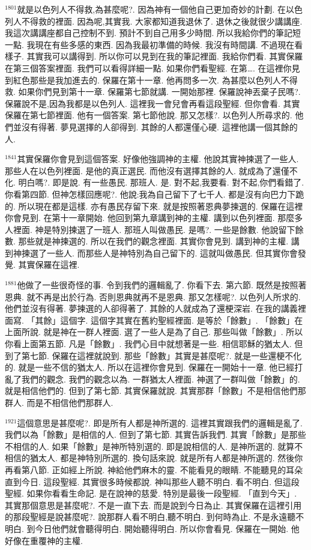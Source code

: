 \documentclass{book}
\begin{document}
$^{1801}$就是以色列人不得救,為甚麼呢?.
因為神有一個他自己更加奇妙的計劃.
在以色列人不得救的裡面.
因為呢,其實我.
大家都知道我退休了.
退休之後就很少講講座.
我這次講講座都自己控制不到.
預計不到自己用多少時間.
所以我給你們的筆記短一點.
我現在有些多感的東西.
因為我最初準備的時候.
我沒有時間講.
不過現在看樣子.
其實我可以講得到.
所以你可以見到在我的筆記裡面.
我給你們看.
其實保羅在第三個答案裡面.
我們可以看得詳細一點.
如果你們看聖經.
在第….
在這裡你見到紅色那些是我加進去的.
保羅在第十一章.
他再問多一次.
為甚麼以色列人不得救.
如果你們見到第十一章.
保羅第七節就講.
一開始那裡.
保羅說神丟棄子民嗎?.
保羅說不是,因為我都是以色列人.
這裡我一會兒會再看這段聖經.
但你會看.
其實保羅在第七節裡面.
他有一個答案.
第七節他說.
那又怎樣?.
以色列人所尋求的.
他們並沒有得著.
夢見選擇的人卻得到.
其餘的人都還僅心硬.
這裡他講一個其餘的人.

$^{1841}$其實保羅你會見到這個答案.
好像他強調神的主權.
他說其實神揀選了一些人.
那些人在以色列裡面.
是他的真正選民.
而他沒有選擇其餘的人.
就成為了還僅不化.
明白嗎?.
即是說.
有一些愚民.
那班人.
是.
對不起,我要看.
對不起,你們看錯了.
你看第四節.
但神怎樣回應呢?.
他說:我為自己留下了七千人.
都是沒有向巴力下跪的.
所以現在都是這樣.
亦有愚民存留下來.
就是按照著恩典夢揀選的.
保羅在這裡你會見到.
在第十一章開始.
他回到第九章講到神的主權.
講到以色列裡面.
那麼多人裡面.
神是特別揀選了一班人.
那班人叫做愚民.
是嗎?.
一些是餘數.
他說留下餘數.
那些就是神揀選的.
所以在我們的觀念裡面.
其實你會見到.
講到神的主權.
講到神揀選了一些人.
而那些人是神特別為自己留下的.
這就叫做愚民.
但其實你會發覺.
其實保羅在這裡.

$^{1881}$他做了一些很奇怪的事.
令到我們的邏輯亂了.
你看下去.
第六節.
既然是按照著恩典.
就不再是出於行為.
否則恩典就再不是恩典.
那又怎樣呢?.
以色列人所求的.
他們並沒有得著.
夢揀選的人卻得著了.
其餘的人就成為了還梗深岩.
在我的講義裡面寫.
「其餘」這個字.
這個字其實在舊約聖經裡面.
是等於「餘數」.
「餘數」在上面所說.
就是神在一群人裡面.
選了一些人是為了自己.
那些叫做「餘數」.
所以你看上面第五節.
凡是「餘數」.
我們心目中就想著是一些.
相信耶穌的猶太人.
但到了第七節.
保羅在這裡就說到.
那些「餘數」其實是甚麼呢?.
就是一些還梗不化的.
就是一些不信的猶太人.
所以在這裡你會見到.
保羅在一開始十一章.
他已經打亂了我們的觀念.
我們的觀念以為.
一群猶太人裡面.
神選了一群叫做「餘數」的.
就是相信他們的.
但到了第七節.
其實保羅就說.
其實那群「餘數」不是相信他們那群人.
而是不相信他們那群人.

$^{1921}$這個意思是甚麼呢?.
即是所有人都是神所選的.
這裡其實跟我們的邏輯是亂了.
我們以為「餘數」是相信的人.
但到了第七節.
其實告訴我們.
其實「餘數」是那些不相信的人.
如果「餘數」是神所特別選的.
即是說相信的人.
是神所選的.
就算不相信的猶太人.
都是神特別所選的.
換句話來說.
就是所有人都是神所選的.
然後你再看第八節.
正如經上所說.
神給他們麻木的靈.
不能看見的眼睛.
不能聽見的耳朵直到今日.
這段聖經.
其實很多時候都說.
神叫那些人聽不明白.
看不明白.
但這段聖經.
如果你看看生命記.
是在說神的慈愛.
特別是最後一段聖經.
「直到今天」.
其實那個意思是甚麼呢?.
不是一直下去.
而是說到今日為止.
其實保羅在這裡引用的那段聖經是說甚麼呢?.
說那群人看不明白,聽不明白.
到何時為止.
不是永遠聽不明白.
到今日他們就會聽得明白.
開始聽得明白.
所以你會看見.
保羅在一開始.
他好像在重覆神的主權.
\end{document}
